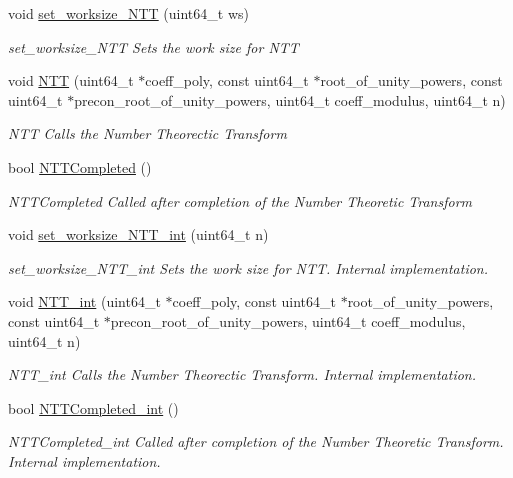 \begin{DoxyCompactItemize}
void \hyperlink{namespaceintel_1_1hexl_1_1fpga_a395d82d33eb68a64244bddc0bd857121}{set\-\_\-worksize\-\_\-\-N\-T\-T} (uint64\-\_\-t ws)
\begin{DoxyCompactList}\small\item\em set\-\_\-worksize\-\_\-\-N\-T\-T Sets the work size for N\-T\-T \end{DoxyCompactList}\item 
void \hyperlink{namespaceintel_1_1hexl_1_1fpga_ab91e470f9e47aa685e33f265926f6af0}{N\-T\-T} (uint64\-\_\-t $\ast$coeff\-\_\-poly, const uint64\-\_\-t $\ast$root\-\_\-of\-\_\-unity\-\_\-powers, const uint64\-\_\-t $\ast$precon\-\_\-root\-\_\-of\-\_\-unity\-\_\-powers, uint64\-\_\-t coeff\-\_\-modulus, uint64\-\_\-t n)
\begin{DoxyCompactList}\small\item\em N\-T\-T Calls the Number Theorectic Transform \end{DoxyCompactList}\item 
bool \hyperlink{namespaceintel_1_1hexl_1_1fpga_ab56525682080c2627f29893276ee8415}{N\-T\-T\-Completed} ()
\begin{DoxyCompactList}\small\item\em N\-T\-T\-Completed Called after completion of the Number Theoretic Transform \end{DoxyCompactList}\item 
void \hyperlink{namespaceintel_1_1hexl_1_1fpga_a4f302a0544c58e8ed0b9818b891ced05}{set\-\_\-worksize\-\_\-\-N\-T\-T\-\_\-int} (uint64\-\_\-t n)
\begin{DoxyCompactList}\small\item\em set\-\_\-worksize\-\_\-\-N\-T\-T\-\_\-int Sets the work size for N\-T\-T. Internal implementation. \end{DoxyCompactList}\item 
void \hyperlink{namespaceintel_1_1hexl_1_1fpga_a18d9571a62d998d2b64c302343c623b9}{N\-T\-T\-\_\-int} (uint64\-\_\-t $\ast$coeff\-\_\-poly, const uint64\-\_\-t $\ast$root\-\_\-of\-\_\-unity\-\_\-powers, const uint64\-\_\-t $\ast$precon\-\_\-root\-\_\-of\-\_\-unity\-\_\-powers, uint64\-\_\-t coeff\-\_\-modulus, uint64\-\_\-t n)
\begin{DoxyCompactList}\small\item\em N\-T\-T\-\_\-int Calls the Number Theorectic Transform. Internal implementation. \end{DoxyCompactList}\item 
bool \hyperlink{namespaceintel_1_1hexl_1_1fpga_a9cf08769dd3a7d8ea67fd03c69067d91}{N\-T\-T\-Completed\-\_\-int} ()
\begin{DoxyCompactList}\small\item\em N\-T\-T\-Completed\-\_\-int Called after completion of the Number Theoretic Transform. Internal implementation. \end{DoxyCompactList}\end{DoxyCompactItemize}
